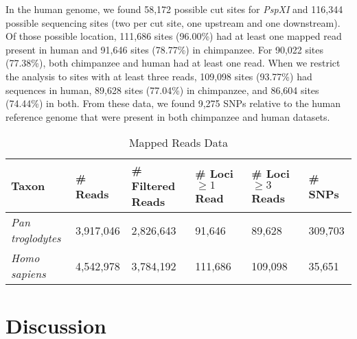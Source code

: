 \documentclass[12pt]{article}
\begin{document}
In the human genome, we found 58,172 possible cut sites for \emph{PspXI} and 116,344 possible sequencing sites (two per cut site, one upstream and one downstream). Of those possible location, 111,686 sites (96.00\%) had at least one mapped read present in human and 91,646 sites (78.77\%) in chimpanzee. For 90,022 sites (77.38\%), both chimpanzee and human had at least one read. When we restrict the analysis to sites with at least three reads, 109,098 sites (93.77\%) had sequences in human, 89,628 sites (77.04\%) in chimpanzee, and 86,604 sites (74.44\%) in both. From these data, we found 9,275 SNPs relative to the human reference genome that were present in both chimpanzee and human datasets.

\begin{table}[h]
\caption{Mapped Reads Data}
\begin{center}
	\small
	\begin{tabular}{ p{3cm} || p{1.75cm} | p{1.75cm} || p{1.75cm} | p{1.75cm} | l }
		\hline
		Taxon                  & \# Reads  & \# Filtered Reads & \# Loci $\ge 1$ Read & \# Loci $\ge 3$ Reads & \# SNPs \\ \hline\hline
		\emph{Pan troglodytes} & 3,917,046 & 2,826,643           &  91,646              &  89,628               & 309,703 \\ \hline
		\emph{Homo sapiens}    & 4,542,978 & 3,784,192           & 111,686              & 109,098               &  35,651 \\ \hline
	\end{tabular}
\end{center}
\end{table}


\section{Discussion}
\end{document}
